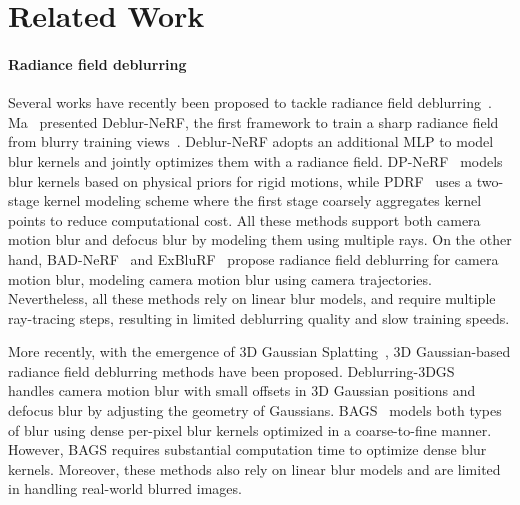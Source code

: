 \section{Related Work}
\label{sec:releated_work}

\paragraph{Radiance field deblurring}
Several works have recently been proposed to tackle radiance field deblurring~\cite{ma2022deblurnerf, wang2023badnerf, lee2023dpnerf, lee2023exblurf, peng2023pdrf}.
Ma \etal~presented Deblur-NeRF, the first framework to train a sharp radiance field from blurry training views~\cite{ma2022deblurnerf}.
Deblur-NeRF adopts an additional MLP to model blur kernels and jointly optimizes them with a radiance field.
DP-NeRF~\cite{lee2023dpnerf} models blur kernels based on physical priors for rigid motions, while PDRF~\cite{peng2023pdrf} uses a two-stage kernel modeling scheme where the first stage coarsely aggregates kernel points to reduce computational cost.
All these methods support both camera motion blur and defocus blur by modeling them using multiple rays.
On the other hand, BAD-NeRF~\cite{wang2023badnerf} and ExBluRF~\cite{lee2023exblurf} propose radiance field deblurring for camera motion blur, modeling camera motion blur using camera trajectories. 
Nevertheless, all these methods rely on linear blur models, and require multiple ray-tracing steps, resulting in limited deblurring quality and slow training speeds.

More recently, with the emergence of 3D Gaussian Splatting~\cite{kerbl2023gaussiansplatting}, 3D Gaussian-based radiance field deblurring methods have been proposed.
Deblurring-3DGS~\cite{lee2024deblurring} handles camera motion blur with small offsets in 3D Gaussian positions and defocus blur by adjusting the geometry of Gaussians. 
BAGS~\cite{peng2024bags} models both types of blur using dense per-pixel blur kernels optimized in a coarse-to-fine manner.
However, BAGS requires substantial computation time to optimize dense blur kernels.
Moreover, these methods also rely on linear blur models and are limited in handling real-world blurred images. 

